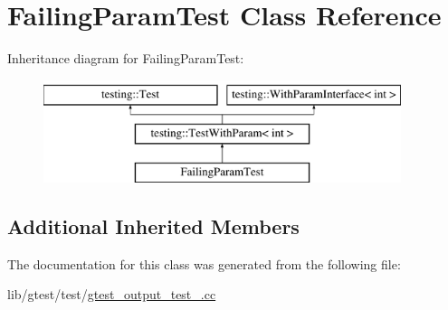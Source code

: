 \hypertarget{class_failing_param_test}{\section{Failing\-Param\-Test Class Reference}
\label{class_failing_param_test}
}
Inheritance diagram for Failing\-Param\-Test\-:\begin{figure}[H]
\begin{center}
\leavevmode
\includegraphics[height=3.000000cm]{class_failing_param_test}
\end{center}
\end{figure}
\subsection*{Additional Inherited Members}


The documentation for this class was generated from the following file\-:\begin{DoxyCompactItemize}
\item 
lib/gtest/test/\hyperlink{gtest__output__test___8cc}{gtest\-\_\-output\-\_\-test\-\_\-.\-cc}\end{DoxyCompactItemize}
